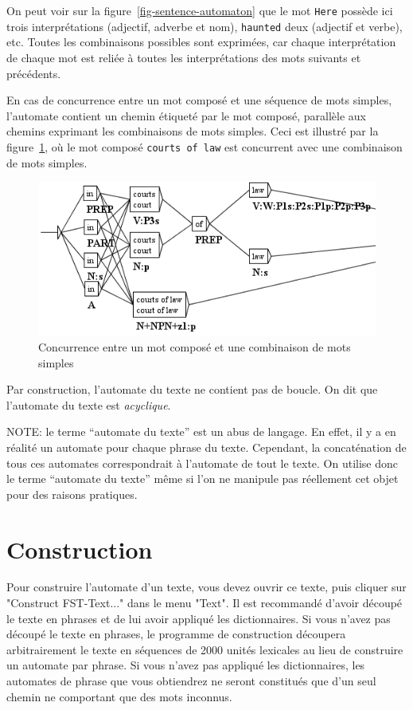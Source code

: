 \bigskip
\noindent On peut voir sur la figure~\ref{fig-sentence-automaton}
que le mot \verb+Here+ possède ici trois interprétations (adjectif, adverbe et nom),
\verb+haunted+ deux (adjectif et verbe), etc. Toutes les combinaisons possibles
sont exprimées, car chaque interprétation de chaque mot est reliée à toutes les interprétations
des mots suivants et précédents.


\bigskip
\noindent En cas de concurrence entre un mot composé et une séquence de mots simples, 
l’automate contient un chemin étiqueté par le mot composé, parallèle aux chemins exprimant
les combinaisons de mots simples. Ceci est illustré par la figure~\ref{fig-overlap}, 
où le mot composé \texttt{courts of law} est concurrent avec une combinaison de mots simples.

\begin{figure}[!ht]
\begin{center}
\includegraphics[width=12.5cm]{resources/img/fig7-2.png}
\caption{Concurrence entre un mot composé et une combinaison de mots simples\label{fig-overlap}}
\end{center}
\end{figure}

\bigskip
\noindent Par construction, l’automate du texte ne contient pas de boucle. On dit que l’automate
du texte est \textit{acyclique}.

\bigskip
\noindent NOTE: le terme ``automate du texte'' est un abus de langage. En effet, il y a en
réalité un automate pour chaque phrase du texte. Cependant, la concaténation de tous ces automates
correspondrait à l’automate de tout le texte. On utilise donc le terme ``automate du texte'' 
même si l’on ne manipule pas réellement cet objet pour des raisons pratiques.

\section{Construction}
    Pour construire l’automate d’un texte, vous devez ouvrir ce texte, puis cliquer sur "Construct
FST-Text..." dans le menu "Text". Il est recommandé d’avoir découpé le texte en phrases et
de lui avoir appliqué les dictionnaires. Si vous n’avez pas découpé le texte en phrases, le
programme de construction découpera arbitrairement le texte en séquences de 2000 unités
lexicales au lieu de construire un automate par phrase. Si vous n’avez pas appliqué les 
dictionnaires, les automates de phrase que vous obtiendrez ne seront constitués que d’un seul
chemin ne comportant que des mots inconnus.



